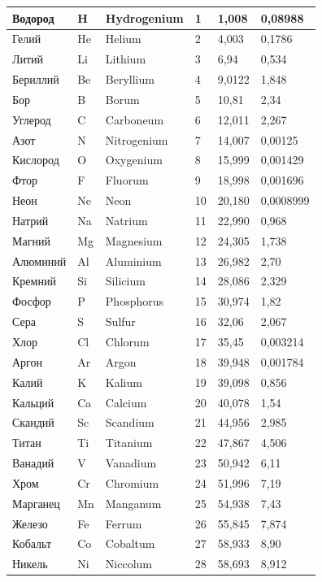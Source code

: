 \documentclass[14pt]{extarticle}
\begin{document}
\begin{longtable}{|p{}|p{}|p{}|p{}|p{}|p{}|}
	Водород & H & Hydrogenium & 1 & 1,008 & 0,08988 \\ \hline
	Гелий & He & Helium & 2 & 4,003 & 0,1786 \\ \hline
	Литий & Li & Lithium & 3 & 6,94 & 0,534 \\ \hline
	Бериллий & Be & Beryllium & 4 & 9,0122 & 1,848 \\ \hline
	Бор & B & Borum & 5 & 10,81 & 2,34 \\ \hline
	Углерод & C & Carboneum & 6 & 12,011 & 2,267 \\ \hline
	Азот & N & Nitrogenium & 7 & 14,007 & 0,00125 \\ \hline
	Кислород & O & Oxygenium & 8 & 15,999 & 0,001429 \\ \hline
	Фтор & F & Fluorum & 9 & 18,998 & 0,001696 \\ \hline
	Неон & Ne & Neon & 10 & 20,180 & 0,0008999 \\ \hline
	Натрий & Na & Natrium & 11 & 22,990 & 0,968 \\ \hline
	Магний & Mg & Magnesium & 12 & 24,305 & 1,738 \\ \hline
	Алюминий & Al & Aluminium & 13 & 26,982 & 2,70 \\ \hline
	Кремний & Si & Silicium & 14 & 28,086 & 2,329 \\ \hline
	Фосфор & P & Phosphorus & 15 & 30,974 & 1,82 \\ \hline
	Сера & S & Sulfur & 16 & 32,06 & 2,067 \\ \hline
	Хлор & Cl & Chlorum & 17 & 35,45 & 0,003214 \\ \hline
	Аргон & Ar & Argon & 18 & 39,948 & 0,001784 \\ \hline
	Калий & K & Kalium & 19 & 39,098 & 0,856 \\ \hline
	Кальций & Ca & Calcium & 20 & 40,078 & 1,54 \\ \hline
	Скандий & Sc & Scandium & 21 & 44,956 & 2,985 \\ \hline
	Титан & Ti & Titanium & 22 & 47,867 & 4,506 \\ \hline
	Ванадий & V & Vanadium & 23 & 50,942 & 6,11 \\ \hline
	Хром & Cr & Chromium & 24 & 51,996 & 7,19 \\ \hline
	Марганец & Mn & Manganum & 25 & 54,938 & 7,43 \\ \hline
	Железо & Fe & Ferrum & 26 & 55,845 & 7,874 \\ \hline
	Кобальт & Co & Cobaltum & 27 & 58,933 & 8,90 \\ \hline
	Никель & Ni & Niccolum & 28 & 58,693 & 8,912 \\ \hline

\end{longtable}
\end{document}
